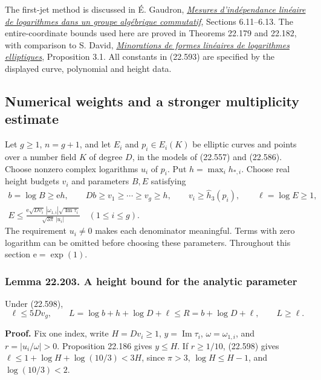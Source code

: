 \documentclass[
  11pt,
  a4paper,
]{article}
\begin{document}
The first-jet method is discussed in É. Gaudron,
\href{https://lmbp.uca.fr/~gaudron/art4.pdf}{\emph{Mesures
d'indépendance linéaire de logarithmes dans un groupe algébrique
commutatif}}, Sections 6.11--6.13. The entire-coordinate bounds used
here are proved in Theorems 22.179 and 22.182, with comparison to S.
David,
\href{https://smf.emath.fr/system/files/filepdf/MSMF_1995_2_62__1_0.pdf}{\emph{Minorations
de formes linéaires de logarithmes elliptiques}}, Proposition 3.1. All
constants in (22.593) are specified by the displayed curve, polynomial
and height data.

\subsection{Numerical weights and a stronger multiplicity
estimate}\label{numerical-weights-and-a-stronger-multiplicity-estimate}

Let \(g\ge1\), \(n=g+1\), and let \(E_i\) and \(p_i\in E_i(K)\) be
elliptic curves and points over a number field \(K\) of degree \(D\), in
the models of (22.557) and (22.586). Choose nonzero complex logarithms
\(u_i\) of \(p_i\). Put \(h=\max_i h_{*,i}\). Choose real height budgets
\(v_i\) and parameters \(B,E\) satisfying \[
\begin{gathered}
 b=\log B\ge \mathrm e h,\qquad
 Db\ge v_1\ge\cdots\ge v_g\ge h,\qquad
 v_i\ge\widehat h_3(p_i),\qquad \ell=\log E\ge1,\\
 E\le\frac{\mathrm e\sqrt{Dv_i}\,|\omega_{1,i}|
                       \sqrt{\operatorname{Im}\tau_i}}
                    {\sqrt{3\pi}\,|u_i|}\quad(1\le i\le g).
\end{gathered}
\tag{22.598}
\] The requirement \(u_i\ne0\) makes each denominator meaningful. Terms
with zero logarithm can be omitted before choosing these parameters.
Throughout this section \(\mathrm e=\exp(1)\).

\subsubsection{Lemma 22.203. A height bound for the analytic
parameter}\label{lemma-22.203.-a-height-bound-for-the-analytic-parameter}

Under (22.598), \[
 \ell\le5Dv_g,\qquad
 L=\log b+h+\log D+\ell\le
 R=b+\log D+\ell,\qquad L\ge\ell.
 \tag{22.599}
\]

\textbf{Proof.} Fix one index, write \(H=Dv_i\ge1\),
\(y=\operatorname{Im}\tau_i\), \(\omega=\omega_{1,i}\), and
\(r=|u_i/\omega|>0\). Proposition 22.186 gives \(y\le H\). If
\(r\ge1/10\), (22.598) gives \(\ell\le1+\log H+\log(10/3)<3H\), since
\(\pi>3\), \(\log H\le H-1\), and \(\log(10/3)<2\).
\end{document}

